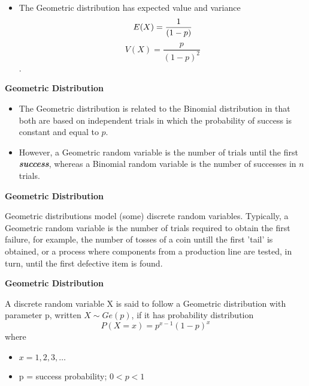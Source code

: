 \documentclass[]{report}
\begin{document}
\begin{itemize}
\item The Geometric distribution has expected value and variance  \[E(X)= {1\over(1-p)}\] \[V(X)=\frac{p}{{(1-p)^2}}\].

\end{itemize}



\noindent \textbf{Geometric Distribution}

\begin{itemize}
\item The Geometric distribution is related to the Binomial distribution in that both are based on independent trials in which the probability of success is constant and equal to $p$. 

\item However, a Geometric random variable is the number of trials until the first \textit{\textbf{success}}, whereas a Binomial random variable is the number of successes in $n$ trials.
\end{itemize}


\noindent \textbf{Geometric Distribution}

Geometric distributions model (some) discrete random variables. Typically, a Geometric random variable is the number of trials required to obtain the first failure, for example, the number of tosses of a coin untill the first 'tail' is obtained, or a process where components from a production line are tested, in turn, until the first defective item is found.


\noindent \textbf{Geometric Distribution}

A discrete random variable X is said to follow a Geometric distribution with parameter p, written $X \sim Ge(p)$, if it has probability distribution
\[P(X=x) = p^{x-1}(1-p)^x\]
where
\begin{itemize}
\item $x = 1, 2, 3, \ldots$
\item p = success probability; $0 < p < 1$
\end{itemize}

\end{document}
